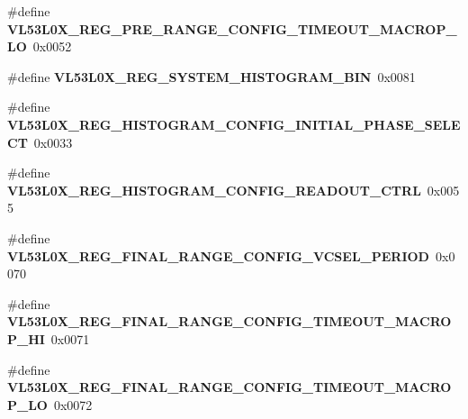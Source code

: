 \begin{DoxyCompactItemize}
\item 
\mbox{\label{group__VL53L0X__DefineRegisters__group_gafc8ac6383b221b1fb7cc2ed0f8988e98}} 
\#define {\bfseries V\+L53\+L0\+X\+\_\+\+R\+E\+G\+\_\+\+P\+R\+E\+\_\+\+R\+A\+N\+G\+E\+\_\+\+C\+O\+N\+F\+I\+G\+\_\+\+T\+I\+M\+E\+O\+U\+T\+\_\+\+M\+A\+C\+R\+O\+P\+\_\+\+LO}~0x0052
\item 
\mbox{\label{group__VL53L0X__DefineRegisters__group_ga7723de846370b1526ed841964fa131ef}} 
\#define {\bfseries V\+L53\+L0\+X\+\_\+\+R\+E\+G\+\_\+\+S\+Y\+S\+T\+E\+M\+\_\+\+H\+I\+S\+T\+O\+G\+R\+A\+M\+\_\+\+B\+IN}~0x0081
\item 
\mbox{\label{group__VL53L0X__DefineRegisters__group_gadadc59b66611cfd794914cb59f53130b}} 
\#define {\bfseries V\+L53\+L0\+X\+\_\+\+R\+E\+G\+\_\+\+H\+I\+S\+T\+O\+G\+R\+A\+M\+\_\+\+C\+O\+N\+F\+I\+G\+\_\+\+I\+N\+I\+T\+I\+A\+L\+\_\+\+P\+H\+A\+S\+E\+\_\+\+S\+E\+L\+E\+CT}~0x0033
\item 
\mbox{\label{group__VL53L0X__DefineRegisters__group_ga1c4164b9dff79f3bb3f9a9061b09ba08}} 
\#define {\bfseries V\+L53\+L0\+X\+\_\+\+R\+E\+G\+\_\+\+H\+I\+S\+T\+O\+G\+R\+A\+M\+\_\+\+C\+O\+N\+F\+I\+G\+\_\+\+R\+E\+A\+D\+O\+U\+T\+\_\+\+C\+T\+RL}~0x0055
\item 
\mbox{\label{group__VL53L0X__DefineRegisters__group_ga914a666dc68689ba49e1b9020e2926b4}} 
\#define {\bfseries V\+L53\+L0\+X\+\_\+\+R\+E\+G\+\_\+\+F\+I\+N\+A\+L\+\_\+\+R\+A\+N\+G\+E\+\_\+\+C\+O\+N\+F\+I\+G\+\_\+\+V\+C\+S\+E\+L\+\_\+\+P\+E\+R\+I\+OD}~0x0070
\item 
\mbox{\label{group__VL53L0X__DefineRegisters__group_gaaaa7d30ac1a4acd72d18f87ba0c7ff02}} 
\#define {\bfseries V\+L53\+L0\+X\+\_\+\+R\+E\+G\+\_\+\+F\+I\+N\+A\+L\+\_\+\+R\+A\+N\+G\+E\+\_\+\+C\+O\+N\+F\+I\+G\+\_\+\+T\+I\+M\+E\+O\+U\+T\+\_\+\+M\+A\+C\+R\+O\+P\+\_\+\+HI}~0x0071
\item 
\mbox{\label{group__VL53L0X__DefineRegisters__group_gafffe675307478155d879c14f418bcfbd}} 
\#define {\bfseries V\+L53\+L0\+X\+\_\+\+R\+E\+G\+\_\+\+F\+I\+N\+A\+L\+\_\+\+R\+A\+N\+G\+E\+\_\+\+C\+O\+N\+F\+I\+G\+\_\+\+T\+I\+M\+E\+O\+U\+T\+\_\+\+M\+A\+C\+R\+O\+P\+\_\+\+LO}~0x0072

\end{DoxyCompactItemize}
